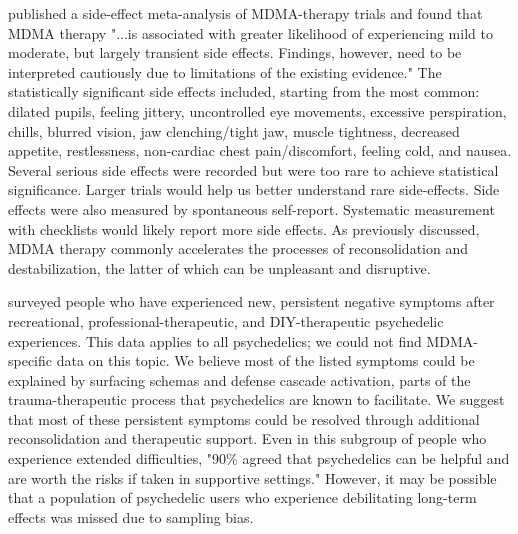 \documentclass[12pt,letterpaper]{article}
\begin{document}
\textcite{colcott2024side} published a side-effect meta-analysis of MDMA-therapy trials and found that MDMA therapy "...is associated with greater likelihood of experiencing mild to moderate, but largely transient side effects. Findings, however, need to be interpreted cautiously due to limitations of the existing evidence." The statistically significant side effects included, starting from the most common: dilated pupils, feeling jittery, uncontrolled eye movements, excessive perspiration, chills, blurred vision, jaw clenching/tight jaw, muscle tightness, decreased appetite, restlessness, non-cardiac chest pain/discomfort, feeling cold, and nausea. Several serious side effects were recorded but were too rare to achieve statistical significance. Larger trials would help us better understand rare side-effects. Side effects were also measured by spontaneous self-report. Systematic measurement with checklists would likely report more side effects. As previously discussed, MDMA therapy commonly accelerates the processes of reconsolidation and destabilization, the latter of which can be unpleasant and disruptive.

\textcite{evans2023extended} surveyed people who have experienced new, persistent negative symptoms after recreational, professional-therapeutic, and DIY-therapeutic psychedelic experiences. This data applies to all psychedelics; we could not find MDMA-specific data on this topic. We believe most of the listed symptoms could be explained by surfacing schemas and defense cascade activation, parts of the trauma-therapeutic process that psychedelics are known to facilitate. We suggest that most of these persistent symptoms could be resolved through additional reconsolidation and therapeutic support. Even in this subgroup of people who experience extended difficulties, "90\% agreed that psychedelics can be helpful and are worth the risks if taken in supportive settings." However, it may be possible that a population of psychedelic users who experience debilitating long-term effects was missed due to sampling bias.

\vspace{\baselineskip}
\end{document}

